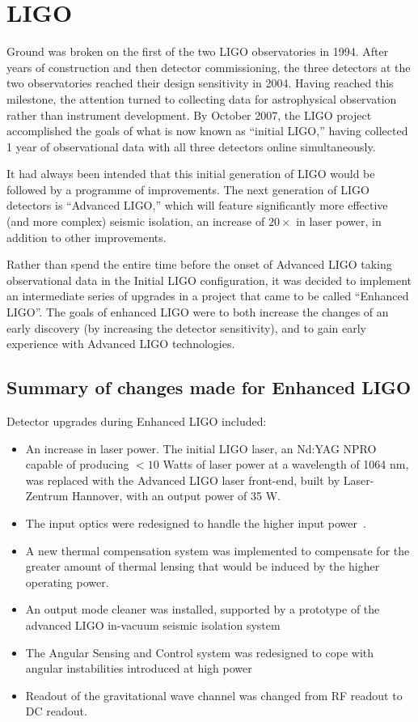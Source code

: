 \section{LIGO}

Ground was broken on the first of the two LIGO observatories in 1994.
After years of construction and then detector commissioning, the three
detectors at the two observatories reached their design sensitivity in
2004.  Having reached this milestone, the attention turned to
collecting data for astrophysical observation rather than instrument
development.  By October 2007, the LIGO project accomplished the goals
of what is now known as ``initial LIGO,'' having collected 1 year of
observational data with all three detectors online simultaneously.

It had always been intended that this initial generation of LIGO would
be followed by a programme of improvements.  The next generation of
LIGO detectors is ``Advanced LIGO,'' which will feature significantly
more effective (and more complex) seismic isolation, an increase of
$20\times$ in laser power, in addition to other improvements.

Rather than spend the entire time before the onset of Advanced LIGO
taking observational data in the Initial LIGO configuration, it was
decided to implement an intermediate series of upgrades in a project
that came to be called ``Enhanced
LIGO''\cite{Adhikari2006Enhanced,T050252,JoshSmithEnhancedAdvanced}.
The goals of enhanced LIGO were to both increase the changes of an
early discovery (by increasing the detector sensitivity), and to gain
early experience with Advanced LIGO technologies.

\subsection{Summary of changes made for Enhanced LIGO}

Detector upgrades during Enhanced LIGO included:
\begin{itemize}
\item An increase in laser power.  The initial LIGO laser, an Nd:YAG
  NPRO capable of producing $< 10$ Watts of laser power at a
  wavelength of 1064 nm, was replaced with the Advanced LIGO laser
  front-end, built by Laser-Zentrum Hannover, with an output power of 35 W.
\item The input optics were redesigned to handle the higher input
  power~\cite{Dooley2011Characterization,Quetschke2008ElectroOptic}.  
\item A new thermal compensation system was implemented to compensate
  for the greater amount of thermal lensing that would be induced by
  the higher operating power.
\item An output mode cleaner was installed, supported by a prototype
  of the advanced LIGO in-vacuum seismic isolation system
\item The Angular Sensing and Control system was redesigned to cope
  with angular instabilities introduced at high
  power~\cite{Sidles2006Optical,DooleyAngular}
\item Readout of the gravitational wave channel was changed from RF
  readout to DC readout.
\end{itemize}

